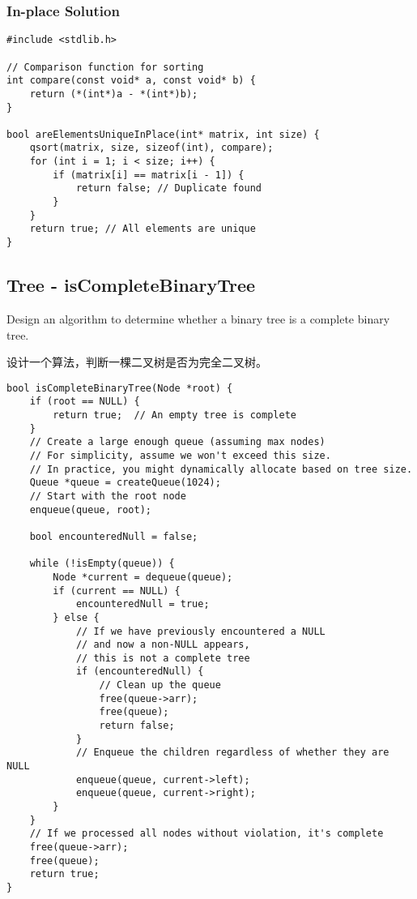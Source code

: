 \documentclass[a4paper]{article}
\begin{document}
\subsubsection{In-place Solution}

\begin{verbatim}
#include <stdlib.h>

// Comparison function for sorting
int compare(const void* a, const void* b) {
    return (*(int*)a - *(int*)b);
}

bool areElementsUniqueInPlace(int* matrix, int size) {
    qsort(matrix, size, sizeof(int), compare);
    for (int i = 1; i < size; i++) {
        if (matrix[i] == matrix[i - 1]) {
            return false; // Duplicate found
        }
    }
    return true; // All elements are unique
}
\end{verbatim}

\newpage

\subsection{Tree - isCompleteBinaryTree}

Design an algorithm to determine whether a binary tree is a complete binary tree.

设计一个算法，判断一棵二叉树是否为完全二叉树。

\begin{verbatim}
bool isCompleteBinaryTree(Node *root) {
    if (root == NULL) {
        return true;  // An empty tree is complete
    }
    // Create a large enough queue (assuming max nodes)
    // For simplicity, assume we won't exceed this size.
    // In practice, you might dynamically allocate based on tree size.
    Queue *queue = createQueue(1024);
    // Start with the root node
    enqueue(queue, root);

    bool encounteredNull = false;

    while (!isEmpty(queue)) {
        Node *current = dequeue(queue);
        if (current == NULL) {
            encounteredNull = true;
        } else {
            // If we have previously encountered a NULL
            // and now a non-NULL appears,
            // this is not a complete tree
            if (encounteredNull) {
                // Clean up the queue
                free(queue->arr);
                free(queue);
                return false;
            }
            // Enqueue the children regardless of whether they are NULL
            enqueue(queue, current->left);
            enqueue(queue, current->right);
        }
    }
    // If we processed all nodes without violation, it's complete
    free(queue->arr);
    free(queue);
    return true;
}
\end{verbatim}
\end{document}
